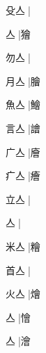 \begin{multicols}{2}
{{\cjk{}殳亼{\cnjzr{}}}|{}\par
{亼{\cnjzr{}}}\mktsJzrVerticalBar{}{\cjk{}{\cnsym{}　}{\cnsym{}　}{\cnsym{}　}}|{\cjk{}獪}\par
{\cjk{}勿亼{\cnjzr{}}}\mktsJzrVerticalBar{}{\cjk{}{\cnsym{}　}{\cnsym{}　}{\cnsym{}　}}|{}\par
{\cjk{}月亼{\cnjzr{}}}\mktsJzrVerticalBar{}{\cjk{}{\cnsym{}　}{\cnsym{}　}{\cnsym{}　}}|{\cjk{}膾}\par
{\cjk{}魚亼{\cnjzr{}}}\mktsJzrVerticalBar{}{\cjk{}{\cnsym{}　}{\cnsym{}　}{\cnsym{}　}}|{\cjk{}鱠}\par
{\cjk{}言亼{\cnjzr{}}}\mktsJzrVerticalBar{}{\cjk{}{\cnsym{}　}{\cnsym{}　}{\cnsym{}　}}|{\cjk{}譮}\par
{\cjk{}广亼{\cnjzr{}}}\mktsJzrVerticalBar{}{\cjk{}{\cnsym{}　}{\cnsym{}　}{\cnsym{}　}}|{\cjk{}廥}\par
{\cjk{}疒亼{\cnjzr{}}}\mktsJzrVerticalBar{}{\cjk{}{\cnsym{}　}{\cnsym{}　}{\cnsym{}　}}|{\cjk{}癐}\par
{\cjk{}立亼{\cnjzr{}}}\mktsJzrVerticalBar{}{\cjk{}{\cnsym{}　}{\cnsym{}　}{\cnsym{}　}}|{}\par
{亼{\cnjzr{}}}\mktsJzrVerticalBar{}{\cjk{}{\cnsym{}　}{\cnsym{}　}{\cnsym{}　}}|{}\par
{\cjk{}米亼{\cnjzr{}}}\mktsJzrVerticalBar{}{\cjk{}{\cnsym{}　}{\cnsym{}　}{\cnsym{}　}}|{\cjk{}糩}\par
{\cjk{}首亼{\cnjzr{}}}\mktsJzrVerticalBar{}{\cjk{}{\cnsym{}　}{\cnsym{}　}{\cnsym{}　}}|{}\par
{\cjk{}火亼{\cnjzr{}}}\mktsJzrVerticalBar{}{\cjk{}{\cnsym{}　}{\cnsym{}　}{\cnsym{}　}}|{\cjk{}燴}\par
{亼{\cnjzr{}}}\mktsJzrVerticalBar{}{\cjk{}{\cnsym{}　}{\cnsym{}　}{\cnsym{}　}}|{\cjk{}懀}\par
{亼{\cnjzr{}}}\mktsJzrVerticalBar{}{\cjk{}{\cnsym{}　}{\cnsym{}　}{\cnsym{}　}}|{\cjk{}澮}\par
}
\end{multicols}
